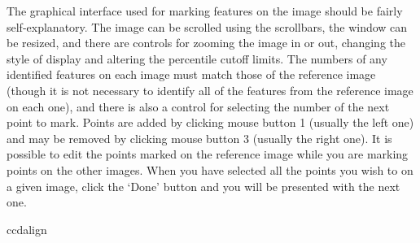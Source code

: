 \documentclass[twoside,11pt]{article}
\renewcommand{\_}{\texttt{\symbol{95}}}
\newcommand{\sstusage}[1]{\item[Usage:] \mbox{}
   \begin{description}
      {\ssttt \item #1}
   \end{description}
}
\newcommand{\sstusage}[1]{\item[Usage:]
      \begin{description}
         {\ssttt #1}
      \end{description}
      \\
   }
\begin{document}
{{      The graphical interface used for marking features on the image
      should be fairly self-explanatory.  The image can be scrolled using
      the scrollbars, the window can be resized, and there are controls
      for zooming the image in or out, changing the style of display and 
      altering the percentile cutoff limits.  The numbers of any 
      identified features on each image must match those of the 
      reference image (though it is not necessary to identify all of 
      the features from the reference image on each one), and there is 
      also a control for selecting the number of the next point to mark.
      Points are added by clicking mouse button 1 (usually the left one) 
      and may be removed by clicking mouse button 3 (usually the right 
      one).  It is possible to edit the points marked on the reference
      image while you are marking points on the other images.  When 
      you have selected all the points you wish to on a given image, 
      click the `Done' button and you will be presented with the next
      one.
   }
   \sstusage{
      ccdalign
   }
}
\end{document}
